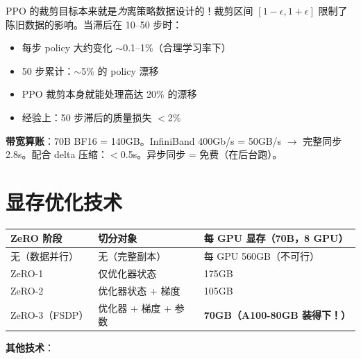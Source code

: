 \begin{intuitionbox}
PPO 的裁剪目标本来就是\emph{为}离策略数据设计的！裁剪区间 $[1-\epsilon, 1+\epsilon]$ 限制了陈旧数据的影响。当滞后在 10--50 步时：

\begin{itemize}
  \item 每步 policy 大约变化 $\sim$0.1--1\%（合理学习率下）
  \item 50 步累计：$\sim$5\% 的 policy 漂移
  \item PPO 裁剪本身就能处理高达 20\% 的漂移
  \item 经验上：50 步滞后的质量损失 $<$2\%
\end{itemize}

\textbf{带宽算账}：70B BF16 = 140GB。InfiniBand 400Gb/s = 50GB/s $\rightarrow$ 完整同步 2.8s。配合 delta 压缩：$<$0.5s。异步同步 = 免费（在后台跑）。
\end{intuitionbox}

\section{显存优化技术}
\label{memory-optimization-techniques}

\begin{center}
\begin{tabular}{@{}l l l@{}}
\toprule
\textbf{ZeRO 阶段} & \textbf{切分对象} & \textbf{每 GPU 显存（70B，8 GPU）} \\
\midrule
无（数据并行） & 无（完整副本） & 每 GPU 560GB（不可行） \\
ZeRO-1 & 仅优化器状态 & 175GB \\
ZeRO-2 & 优化器状态 + 梯度 & 105GB \\
ZeRO-3（FSDP） & 优化器 + 梯度 + 参数 & \textbf{70GB（A100-80GB 装得下！）} \\
\bottomrule
\end{tabular}
\end{center}

\textbf{其他技术}：


